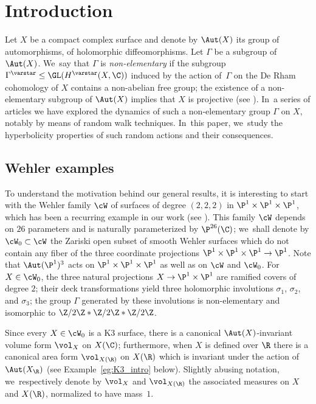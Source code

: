 \section{Introduction}\label{sec:intro}

Let $X$ be a compact complex
surface and denote by $\Aut(X)$ its group of
automorphisms, \ie of holomorphic diffeomorphisms. Let $\Gamma$ be a subgroup of $\Aut(X)$. We~say that $\Gamma$ is \emph{non-elementary} if the subgroup
$\Gamma^\varstar\leq \GL(H^\varstar (X, \C))$ induced by the action of~$\Gamma$ on the De Rham cohomology of $X$ contains a non-abelian free group; the existence of
a non-elementary subgroup of $\Aut(X)$
implies that $X$ is projective (see \cite{Simons}). In~a series of articles \cite{stiffness, finite_orbits, invariant} we have
explored the dynamics of such a non-elementary group $\Gamma$ on $X$, notably by
means of random walk techniques. In~this paper, we~study the hyperbolicity properties of such random actions and their consequences.

\subsection{Wehler examples} \label{subs:wehler}
To understand the motivation behind our general results,
it is interesting to start with the Wehler family $ \cW$ of
surfaces of degree $(2,2,2)$ in $\P^1\times \P^1\times \P^1$, which has been a
recurring example in our work (see \eg \cite[\S 3]{stiffness}).
This family $ \cW$ depends on $26$ parameters and is naturally parameterized by
$\P^{26}(\C)$; we~shall denote by $ \cW_0\subset \cW$ the
Zariski open subset of smooth Wehler surfaces which do not contain any fiber of the three coordinate projections $\P^1\times \P^1\times \P^1\to \P^1$. Note that $\Aut(\P^1)^3$ acts on $\P^1\times\P^1\times \P^1$ as well as on $\cW$ and $\cW_0$.
For $X\in \cW_0$, the three natural projections $X\to \P^1\times \P^1$ are ramified covers of degree $2$; their deck transformations yield three holomorphic
involutions $\sigma_1$, $\sigma_2$, and $\sigma_3$;
the group $\Gamma$ generated by these involutions is non-elementary and isomorphic to
$\Z/2\Z\ast\Z/2\Z\ast\Z/2\Z$.

Since every $X\in \cW_0$ is a K3 surface,
there is a canonical $\Aut(X)$-invariant volume form $\vol_X$ on $X(\C)$; furthermore,
when $X$ is defined over $\R$ there is a canonical area form $\vol_{X(\R)}$
on $X(\R)$ which is invariant under the action of $\Aut(X_\R)$ (see Example~\ref{eg:K3_intro} below).
Slightly abusing notation, we~respectively denote by $\vol_X$ and $\vol_{X(\R)}$
the associated measures on $X$ and $X(\R)$, normalized to
have mass~$1$.

